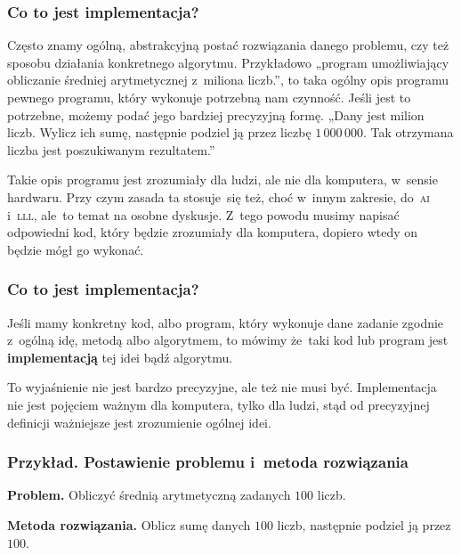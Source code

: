 \documentclass[10pt,t]{beamer}
\begin{document}
\begin{frame}
  \frametitle{Co to jest implementacja?}


  Często znamy ogólną, abstrakcyjną postać rozwiązania danego problemu, czy
  też sposobu działania konkretnego algorytmu. Przykładowo „program
  umożliwiający obliczanie średniej arytmetycznej z~miliona liczb.”, to
  taka ogólny opis programu pewnego programu, który wykonuje potrzebną nam
  czynność. Jeśli jest to potrzebne, możemy podać jego bardziej precyzyjną
  formę. „Dany jest milion liczb. Wylicz ich sumę, następnie podziel ją
  przez liczbę $1 \, 000 \, 000$. Tak otrzymana liczba jest poszukiwanym
  rezultatem.”

  Takie opis programu jest zrozumiały dla ludzi, ale nie dla komputera,
  w~sensie hardwaru. Przy czym zasada ta stosuje~się też, choć w~innym
  zakresie, do~\textsc{ai} i~\textsc{lll}, ale~to temat na osobne dyskusje.
  Z~tego powodu musimy napisać odpowiedni kod, który będzie zrozumiały dla
  komputera, dopiero wtedy on będzie mógł go wykonać.

\end{frame}





\begin{frame}
  \frametitle{Co to jest implementacja?}


  Jeśli mamy konkretny kod, albo program, który wykonuje dane zadanie
  zgodnie z~ogólną idę, metodą albo algorytmem, to mówimy że~taki kod lub
  program jest \textbf{implementacją} tej idei bądź algorytmu.

  To wyjaśnienie nie jest bardzo precyzyjne, ale też nie musi być.
  Implementacja nie jest pojęciem ważnym dla komputera, tylko dla ludzi,
  stąd od precyzyjnej definicji ważniejsze jest zrozumienie ogólnej idei.

\end{frame}





\begin{frame}
  \frametitle{Przykład. Postawienie problemu i~metoda rozwiązania}


  \textbf{Problem.} Obliczyć średnią arytmetyczną zadanych $100$ liczb.

  \textbf{Metoda rozwiązania.} Oblicz sumę danych $100$ liczb, następnie
  podziel ją przez $100$.

\end{frame}
\end{document}
